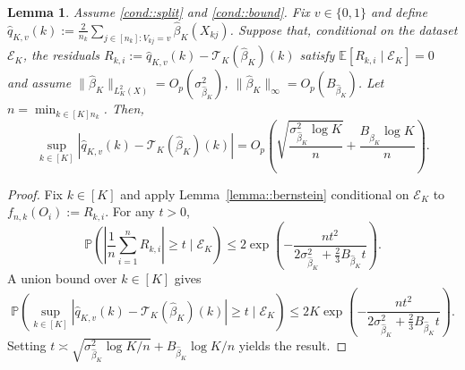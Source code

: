 \documentclass[11pt]{article}
\theoremstyle{plain}
\newtheorem{lemma}{Lemma}
\theoremstyle{definition}
\theoremstyle{remark}
\theoremstyle{definition}
\begin{document}
 

\begin{lemma}\label{lemma::sup_residual_bound}
Assume \ref{cond::split} and \ref{cond::bound}. Fix \( v \in \{0,1\} \) and define \( \widehat{q}_{K,v}(k) := \frac{2}{n_k} \sum_{j \in [n_k] : V_{kj} = v} \widehat{\beta}_K(X_{kj}) \). Suppose that, conditional on the dataset \( \mathcal{E}_K \), the residuals \( R_{k,i} := \widehat{q}_{K,v}(k) - \mathcal{T}_K(\widehat{\beta}_K)(k) \) satisfy $\mathbb{E}[R_{k,i} \mid \mathcal{E}_K] = 0$
and assume \( \|\widehat{\beta}_K\|_{L^2_K(X)} = O_p(\sigma_{\widehat{\beta}_K}^2) \), \( \|\widehat{\beta}_K\|_\infty = O_p(B_{\widehat{\beta}_K}) \). Let $n = \min_{k \in [K] n_k}$.  Then,
\[
\sup_{k \in [K]} \left| \widehat{q}_{K,v}(k) - \mathcal{T}_K(\widehat{\beta}_K)(k) \right| = O_p\left( \sqrt{\frac{\sigma_{\widehat{\beta}_K}^2 \log K}{n}} + \frac{B_{\widehat{\beta}_K} \log K}{n} \right).
\]
\end{lemma}

\begin{proof}
Fix \( k \in [K] \) and apply Lemma~\ref{lemma::bernstein} conditional on \( \mathcal{E}_K \) to \( f_{n,k}(O_i) := R_{k,i} \). For any \( t > 0 \),
\[
\mathbb{P}\left( \left| \frac{1}{n} \sum_{i=1}^n R_{k,i} \right| \ge t \mid \mathcal{E}_K \right) \le 2 \exp\left( - \frac{n t^2}{2 \sigma_{\widehat{\beta}_K}^2 + \frac{2}{3} B_{\widehat{\beta}_K} t} \right).
\]
A union bound over \( k \in [K] \) gives
\[
\mathbb{P}\left( \sup_{k \in [K]} \left| \widehat{q}_{K,v}(k) - \mathcal{T}_K(\widehat{\beta}_K)(k) \right| \ge t \mid \mathcal{E}_K \right) \le 2K \exp\left( - \frac{n t^2}{2 \sigma_{\widehat{\beta}_K}^2 + \frac{2}{3} B_{\widehat{\beta}_K} t} \right).
\]
Setting \( t \asymp \sqrt{ \sigma_{\widehat{\beta}_K}^2 \log K / n } + B_{\widehat{\beta}_K} \log K / n \) yields the result.
\end{proof}
\end{document}
